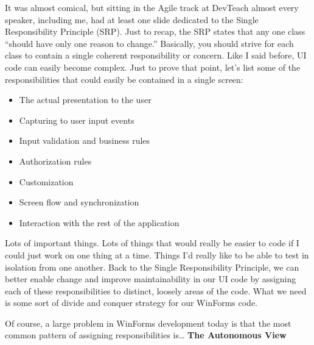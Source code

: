 \documentclass{article}
\begin{document}
{It was almost comical, but sitting in the Agile track at DevTeach almost every speaker, including me, had at least one slide dedicated to the Single Responsibility Principle (SRP).  Just to recap, the SRP states that any one class “should have only one reason to change.”  Basically, you should strive for each class to contain a single coherent responsibility or concern.  Like I said before, UI code can easily become complex.  Just to prove that point, let's list some of the responsibilities that could easily be contained in a single screen:

 \begin{itemize}
 \item  The actual presentation to the user  \vspace{5pt}
 \item  Capturing to user input events  \vspace{5pt}
 \item  Input validation and business rules  \vspace{5pt}
 \item  Authorization rules  \vspace{5pt}
 \item  Customization  \vspace{5pt}
 \item  Screen flow and synchronization  \vspace{5pt}
 \item  Interaction with the rest of the application  \vspace{5pt}
  \end{itemize}

Lots of important things.  Lots of things that would really be easier to code if I could just work on one thing at a time.  Things I'd really like to be able to test in isolation from one another.  Back to the Single Responsibility Principle, we can better enable change and improve maintainability in our UI code by assigning each of these responsibilities to distinct, loosely areas of the code.  What we need is some sort of divide and conquer strategy for our WinForms code.

Of course, a large problem in WinForms development today is that the most common pattern of assigning responsibilities is…
\Large {\textbf{The Autonomous View}}

}
\end{document}

